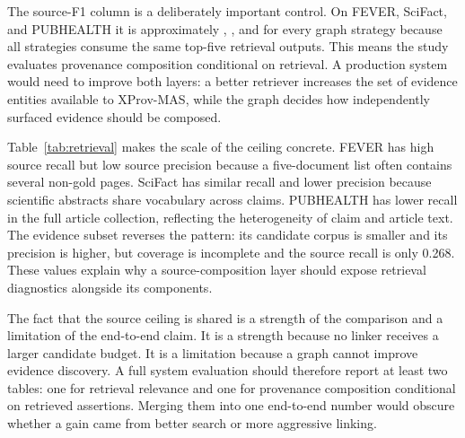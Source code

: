 \documentclass{ieeeaccess}
\begin{document}
The source-F1 column is a deliberately important control. On FEVER, SciFact, and PUBHEALTH it is approximately \FEVERXProvSourceFOne, \SciFactXProvSourceFOne, and \PubHealthXProvSourceFOne for every graph strategy because all strategies consume the same top-five retrieval outputs. This means the study evaluates provenance composition conditional on retrieval. A production system would need to improve both layers: a better retriever increases the set of evidence entities available to XProv-MAS, while the graph decides how independently surfaced evidence should be composed.

\begin{table}[!ht]
\centering
\caption{Upstream top-five source-retrieval ceiling, identical across linkers.}
\label{tab:retrieval}
\end{table}

Table~\ref{tab:retrieval} makes the scale of the ceiling concrete. FEVER has high source recall but low source precision because a five-document list often contains several non-gold pages. SciFact has similar recall and lower precision because scientific abstracts share vocabulary across claims. PUBHEALTH has lower recall in the full article collection, reflecting the heterogeneity of claim and article text. The evidence subset reverses the pattern: its candidate corpus is smaller and its precision is higher, but coverage is incomplete and the source recall is only 0.268. These values explain why a source-composition layer should expose retrieval diagnostics alongside its components.

The fact that the source ceiling is shared is a strength of the comparison and a limitation of the end-to-end claim. It is a strength because no linker receives a larger candidate budget. It is a limitation because a graph cannot improve evidence discovery. A full system evaluation should therefore report at least two tables: one for retrieval relevance and one for provenance composition conditional on retrieved assertions. Merging them into one end-to-end number would obscure whether a gain came from better search or more aggressive linking.
\end{document}
